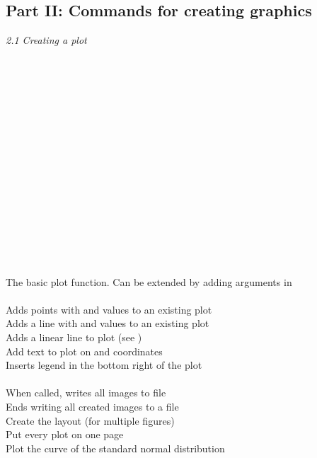\label{rhelpparttwo}

\subsection{Part II: Commands for creating graphics}

\textit{2.1 Creating a plot} \\
\\
\begin{minipage}[t]{.4\textwidth}
\vspace*{-8pt}
 \\
\\
\\
 \\
 \\
 \\
 \\
 \\
\\
 \\		
 \\
 \\
 \\
 \\
\end{minipage}
\begin{minipage}[t]{.6\textwidth}
The basic plot function. Can be extended by adding arguments in  \\
\\
Adds points with  and  values to an existing plot \\
Adds a line with  and  values to an existing plot \\
Adds a linear line to plot (see ) \\
Add text to plot on  and  coordinates \\
Inserts legend in the bottom right of the plot \\
\\
When called, writes all images to  file  \\
Ends writing all created images to a file  \\
Create the layout (for multiple figures) \\
Put every plot on one page \\
Plot the curve of the standard normal distribution
\end{minipage}
\vspace*{.5cm}

